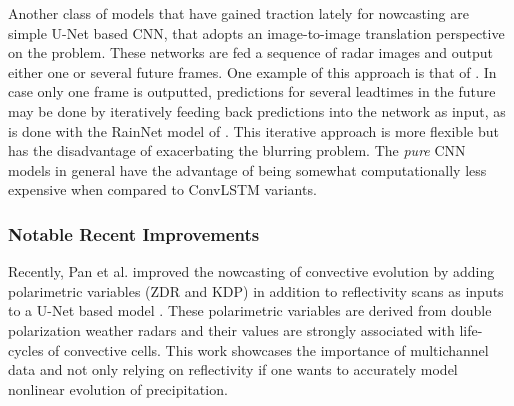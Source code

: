 Another class of models that have gained traction lately for nowcasting are simple U-Net based CNN, that adopts an image-to-image translation perspective on the problem. These networks are fed a sequence of radar images and output either one or several future frames. One example of this approach is  that of \citet{agrawal_machine_2019}. In case only one frame is outputted, predictions for several leadtimes in the future may be done by iteratively feeding back predictions into the network as input, as is done with the RainNet model of \citet{ayzel_rainnet_nodate}. This iterative approach is more flexible but has the disadvantage of exacerbating the blurring problem. The \textit{pure} CNN models in general have the advantage of being somewhat computationally less expensive when compared to ConvLSTM variants. 

\subsubsection*{Notable Recent Improvements}

Recently, Pan et al. improved the nowcasting of convective evolution by adding  polarimetric variables (ZDR and KDP) in addition to reflectivity scans as inputs to a U-Net based model \cite{pan_improving_2021}. These polarimetric variables are derived from double polarization weather radars and their values are strongly associated with life-cycles of convective cells. This work showcases the importance of multichannel data and not only relying on reflectivity if one wants to accurately model nonlinear evolution of precipitation.

